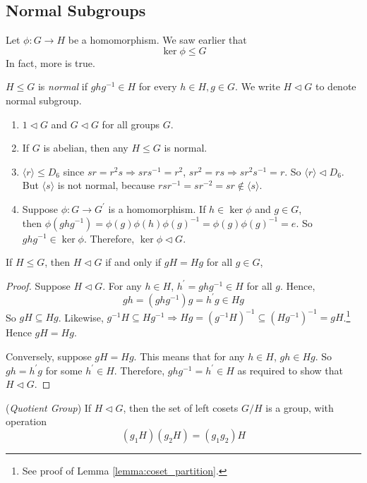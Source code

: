 \documentclass[10pt, a4paper, twoside]{report}
\begin{document}
\subsection{Normal Subgroups}
Let \(\phi:G\to H\) be a homomorphism. We saw earlier that 
\[\ker\phi\leq G\]
In fact, more is true.
\begin{definition}
    \(H\leq G\) is \emph{normal} if \(ghg^{-1}\in H\) for every \(h\in H,g\in G\). We write \(H\lhd G\) to denote normal subgroup.
\end{definition}
\begin{example} \item[]
    \begin{enumerate}
        \item \(1\lhd G\) and \(G\lhd G\) for all groups \(G\).
        \item If \(G\) is abelian, then any \(H\leq G\) is normal.
        \item \(\langle r\rangle\leq D_6\) since \(sr=r^2s\Rightarrow srs^{-1}=r^2\), \(sr^2=rs\Rightarrow sr^2s^{-1}=r\). So \(\langle r\rangle\lhd D_6\). But \(\langle s\rangle\) is not normal, because \(rsr^{-1}=sr^{-2}=sr\notin\langle s\rangle\).
        \item Suppose \(\phi:G\to G^\prime\) is a homomorphism. If \(h\in\ker\phi\) and \(g\in G\), \\ then \(\phi(ghg^{-1})=\phi(g)\phi(h)\phi(g)^{-1}=\phi(g)\phi(g)^{-1}=e\). So \(ghg^{-1}\in\ker\phi\).  Therefore, \(\ker\phi\lhd G\).
    \end{enumerate}
\end{example}
\begin{lemma}
    If \(H\leq G\), then \(H\lhd G\) if and only if \(gH=Hg\) for all \(g\in G\),
\end{lemma}
\begin{proof}
    Suppose \(H\lhd G\). For any \(h\in H\), \(h^\prime=ghg^{-1}\in H\) for all \(g\). Hence, 
    \[gh=(ghg^{-1})g=h^\prime g\in Hg\]
    So \(gH\subseteq Hg\). Likewise, \(g^{-1}H\subseteq Hg^{-1}\Rightarrow Hg=(g^{-1}H)^{-1}\subseteq (Hg^{-1})^{-1}=gH\).\footnote{See proof of Lemma \ref{lemma:coset_partition}.} Hence \(gH=Hg\).
    
    Conversely, suppose \(gH=Hg\). This means that for any \(h\in H\), \(gh\in Hg\). So \(gh=h^\prime g\) for some \(h^\prime\in H\). Therefore, \(ghg^{-1}=h^\prime\in H\) as required to show that \(H\lhd G\).
\end{proof}
\begin{theorem}
    (\emph{Quotient Group}) If \(H\lhd G\), then the set of left cosets \(G/H\) is a group, with operation \[(g_1H)(g_2H)=(g_1g_2)H\]
\end{theorem}
\end{document}
